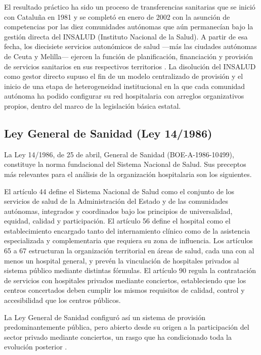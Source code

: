 El resultado práctico ha sido un proceso de transferencias sanitarias que se inició con Cataluña en 1981 y se completó en enero de 2002 con la asunción de competencias por las diez comunidades autónomas que aún permanecían bajo la gestión directa del INSALUD (Instituto Nacional de la Salud). A partir de esa fecha, los diecisiete servicios autonómicos de salud ---más las ciudades autónomas de Ceuta y Melilla--- ejercen la función de planificación, financiación y provisión de servicios sanitarios en sus respectivos territorios \citep{observatorioHIT2024}. La disolución del INSALUD como gestor directo supuso el fin de un modelo centralizado de provisión y el inicio de una etapa de heterogeneidad institucional en la que cada comunidad autónoma ha podido configurar su red hospitalaria con arreglos organizativos propios, dentro del marco de la legislación básica estatal.

\subsection{Ley General de Sanidad (Ley 14/1986)}

La Ley 14/1986, de 25 de abril, General de Sanidad (BOE-A-1986-10499), constituye la norma fundacional del Sistema Nacional de Salud. Sus preceptos más relevantes para el análisis de la organización hospitalaria son los siguientes.

El artículo 44 define el Sistema Nacional de Salud como el conjunto de los servicios de salud de la Administración del Estado y de las comunidades autónomas, integrados y coordinados bajo los principios de universalidad, equidad, calidad y participación. El artículo 56 define el hospital como el establecimiento encargado tanto del internamiento clínico como de la asistencia especializada y complementaria que requiera su zona de influencia. Los artículos 65 a 67 estructuran la organización territorial en áreas de salud, cada una con al menos un hospital general, y prevén la vinculación de hospitales privados al sistema público mediante distintas fórmulas. El artículo 90 regula la contratación de servicios con hospitales privados mediante conciertos, estableciendo que los centros concertados deben cumplir los mismos requisitos de calidad, control y accesibilidad que los centros públicos.

La Ley General de Sanidad configuró así un sistema de provisión predominantemente pública, pero abierto desde su origen a la participación del sector privado mediante conciertos, un rasgo que ha condicionado toda la evolución posterior \citep{peman2005}.

